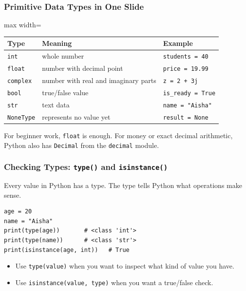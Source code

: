 \documentclass[aspectratio=169,10pt]{beamer}
\newcommand{\myitem}[1]{\item #1\vspace{0.04cm}}
\begin{document}
\begin{frame}[fragile]
\frametitle{Primitive Data Types in One Slide}
\vspace{-0.05cm}
\begin{adjustbox}{max width=\textwidth}
\begin{tabular}{@{}p{2.2cm}p{4.8cm}p{5.4cm}@{}}
\toprule
\textbf{Type} & \textbf{Meaning} & \textbf{Example} \\
\midrule
\texttt{int} & whole number & \texttt{students = 40} \\
\texttt{float} & number with decimal point & \texttt{price = 19.99} \\
\texttt{complex} & number with real and imaginary parts & \texttt{z = 2 + 3j} \\
\texttt{bool} & true/false value & \texttt{is\_ready = True} \\
\texttt{str} & text data & \texttt{name = "Aisha"} \\
\texttt{NoneType} & represents no value yet & \texttt{result = None} \\
\bottomrule
\end{tabular}
\end{adjustbox}

\vspace{0.35cm}
\begin{tcolorbox}[lecturebox,title=Decimal note]
For beginner work, \texttt{float} is enough. For money or exact decimal arithmetic, Python also has \texttt{Decimal} from the \texttt{decimal} module.
\end{tcolorbox}
\end{frame}


\begin{frame}[fragile]
\frametitle{Checking Types: \texttt{type()} and \texttt{isinstance()}}
\begin{tcolorbox}[lecturebox,title=Key idea]
Every value in Python has a type. The type tells Python what operations make sense.
\end{tcolorbox}

\vspace{0.2cm}
\begin{lstlisting}[style=pycode]
age = 20
name = "Aisha"
print(type(age))       # <class 'int'>
print(type(name))      # <class 'str'>
print(isinstance(age, int))   # True
\end{lstlisting}

\vspace{0.15cm}
\begin{itemize}
  \myitem{Use \texttt{type(value)} when you want to inspect what kind of value you have.}
  \myitem{Use \texttt{isinstance(value, type)} when you want a true/false check.}
\end{itemize}
\end{frame}
\end{document}
